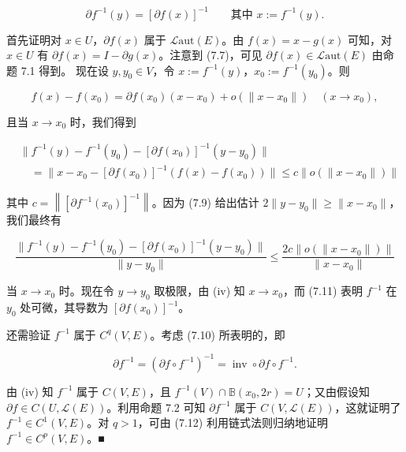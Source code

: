 \begin{theorem}
\begin{subitems}
\begin{equation}
\partial f^{-1}(y) = \left[\partial f(x)\right]^{-1} \qquad \text{其中 } x := f^{-1}(y) .\tag{7.10}
\end{equation}

首先证明对 $ x \in U $，$ \partial f(x) $ 属于 $ \mathcal{L}\mathrm{aut}(E) $。由 $ f(x) = x - g(x) $ 可知，对 $ x \in U $ 有 $ \partial f(x) = I - \partial g(x) $。注意到 (7.7)，可见 $ \partial f(x) \in \mathcal{L}\mathrm{aut}(E) $ 由命题 7.1 得到。
现在设 $ y, y_{0} \in V $，令 $ x := f^{-1}(y) $，$ x_{0} := f^{-1}(y_{0}) $。则

\[
f(x) - f(x_{0}) = \partial f(x_{0})(x - x_{0}) + o(\|x - x_{0}\|) \quad (x \to x_{0}) ,
\]

且当 $ x \to x_{0} $ 时，我们得到

\begin{equation*}
\begin{aligned}
&\|f^{-1}(y) - f^{-1}(y_{0}) - \left[\partial f(x_{0})\right]^{-1}(y - y_{0})\| \\ &\quad = \|x - x_{0} - \left[\partial f(x_{0})\right]^{-1}(f(x) - f(x_{0}))\| \le c\left\|o(\|x - x_{0}\|)\right\|
\end{aligned}
\end{equation*}

其中 $ c = \left\|\left[\partial f^{-1}(x_{0})\right]^{-1}\right\| $。因为 (7.9) 给出估计 $ 2\|y - y_{0}\| \ge \|x - x_{0}\| $，我们最终有

\begin{equation}
\frac{\|f^{-1}(y) - f^{-1}(y_{0}) - \left[\partial f(x_{0})\right]^{-1}(y - y_{0})\|}{\|y - y_{0}\|} \le \frac{2c\left\|o(\|x - x_{0}\|)\right\|}{\|x - x_{0}\|}\tag{7.11}
\end{equation}

当 $ x \to x_{0} $ 时。现在令 $ y \to y_{0} $ 取极限，由 (iv) 知 $ x \to x_{0} $，而 (7.11) 表明 $ f^{-1} $ 在 $ y_{0} $ 处可微，其导数为 $ \left[\partial f(x_{0})\right]^{-1} $。

\item[（vi）]

还需验证 $ f^{-1} $ 属于 $ C^{q}(V, E) $。考虑 (7.10) 所表明的，即

\begin{equation}
\partial f^{-1} = (\partial f \circ f^{-1})^{-1} = \operatorname{inv} \circ \partial f \circ f^{-1} .\tag{7.12}
\end{equation}

由 (iv) 知 $ f^{-1} $ 属于 $ C(V, E) $，且 $ f^{-1}(V) \cap \mathbb{B}(x_{0}, 2r) = U $；又由假设知 $ \partial f \in C(U, \mathcal{L}(E)) $。利用命题 7.2 可知 $ \partial f^{-1} $ 属于 $ C(V, \mathcal{L}(E)) $，这就证明了 $ f^{-1} \in C^{1}(V, E) $。对 $ q > 1 $，可由 (7.12) 利用链式法则归纳地证明 $ f^{-1} \in C^{p}(V, E) $。\nobreak\hspace{0.35em}■

\end{subitems}

\end{theorem}

